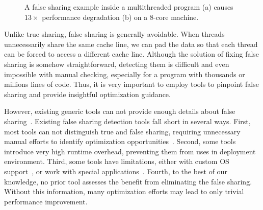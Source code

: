 \begin{figure}[htbp]
\centering
{}%
\hspace{20pt}
\caption{
A false sharing example inside a multithreaded program (a) causes $13\times$ performance degradation (b) on a 8-core machine.
\label{fig:penalty}}
\end{figure}

Unlike true sharing, false sharing is generally avoidable. When threads unnecessarily share the same cache line, we can pad the data so that each thread can be forced to access a different cache line. Although the solution of fixing false sharing is somehow straightforward, detecting them is difficult and even impossible with manual checking, especially for a program with thousands or millions lines of code. Thus, it is very important to employ tools to pinpoint false sharing and provide insightful optimization guidance.

However, existing generic tools can not provide enough details about false sharing~\cite{gprof, ibs-sc, Intel:VTune}. Existing false sharing detection tools fall short in several ways. First, most tools can not distinguish true and false sharing, requiring unnecessary manual efforts to identify optimization opportunities~\cite{falseshare:binaryinstrumentation1,detect:ptu,detect:intel,falseshare:binaryinstrumentation2,DProf, qinzhao, OSdetection, mldetect, Wicaksono11detectingfalse, openmp}. Second, some tools~\cite{falseshare:binaryinstrumentation1,falseshare:binaryinstrumentation2,falseshare:simulator, Predator} introduce very high runtime overhead, preventing them from uses in deployment environment. Third, some tools have limitations, either with custom OS support~\cite{OSdetection}, or work with special applications~\cite{Sheriff}. Fourth, to the best of our knowledge, no prior tool assesses the benefit from eliminating the false sharing. Without this information, many optimization efforts may lead to only trivial performance improvement.

